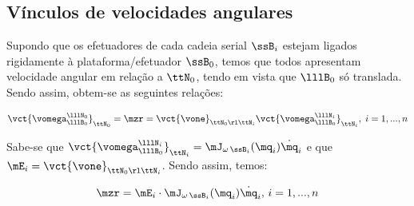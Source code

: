 \documentclass[]{politex}
\begin{document}
\subsection{Vínculos de velocidades angulares} 

Supondo que os efetuadores de cada cadeia serial $\ssB_i$ estejam ligados rigidamente à plataforma/efetuador $\ssB_0$, temos que todos apresentam velocidade angular em relação a $\ttN_0$, tendo em vista que $\lllB_0$ só translada. Sendo assim, obtem-se as seguintes relações:

\begin{equation}
\vct{\vomega^{\lllN_0}_{\lllB_0}}_{\ttN_0} = \mzr = \vct{\vone}_{\ttN_0 \rl \ttN_i}  \vct{\vomega^{\lllN_i}_{\lllB_0}}_{\ttN_i} , \; i = 1, ... , n
\end{equation}

Sabe-se que $\vct{\vomega^{\lllN_i}_{\lllB_0}}_{\ttN_i} =  \mJ_{\omega\,\ssB_i}(\mq_i) \dot{\mq}_i$ e que $\mE_i =\vct{\vone}_{\ttN_0 \rl \ttN_i}$. Sendo assim, temos:

\begin{equation}
\mzr = \mE_i \cdot \mJ_{\omega\,\ssB_i}(\mq_i) \dot{\mq}_i, \, i = 1,...,n
\end{equation}
\end{document}
